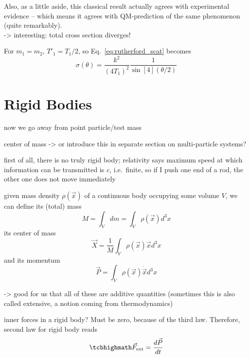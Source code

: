 \documentclass[../class_mech_main.tex]{subfiles}
\begin{document}
Also, as a little aside, this classical result actually agrees with experimental evidence -- which means it agrees with QM-prediction of the same phenomenon (quite remarkably).\\


-> interesting: total cross section diverges!


For $m_1 = m_2$, $T'_1 = T_1/2$, so Eq.~\eqref{eq:rutherford_scat} becomes
\begin{equation}
	\sigma(\theta) = \frac{k^2}{(4 T_1)^2} \frac{1}{\sin[4](\theta/2)}
\end{equation}



    \section{Rigid Bodies}

now we go away from point particle/test mass


center of mass -> or introduce this in separate section on multi-particle systems?



first of all, there is no truly rigid body; relativity says maximum speed at which information can be transmitted is $c$, i.e.~finite, so if I push one end of a rod, the other one does not move immediately




given mass density $\rho(\vec{x})$ of a continuous body occupying some volume $V$, we can define its (total) mass
\begin{equation}
	M = \int_V dm
	= \int_V \rho(\vec{x}) d^3x
\end{equation}
its center of mass
\begin{equation}
	\vec{X} = \frac{1}{M} \int_V \rho(\vec{x}) \vec{x} d^3x
\end{equation}
and its momentum
\begin{equation}
	\vec{P} = \int_V \rho(\vec{x}) \dot{\vec{x}} d^3x
\end{equation}


-> good for us that all of these are additive quantities (sometimes this is also called extensive, a notion coming from thermodynamics)


inner forces in a rigid body? Must be zero, because of the third law. Therefore, second law for rigid body reads
\begin{equation}
	\eqbox{
		\vec{F}_\mathrm{ext} = \dv{\vec{P}}{t}
	}
\end{equation}
\end{document}
